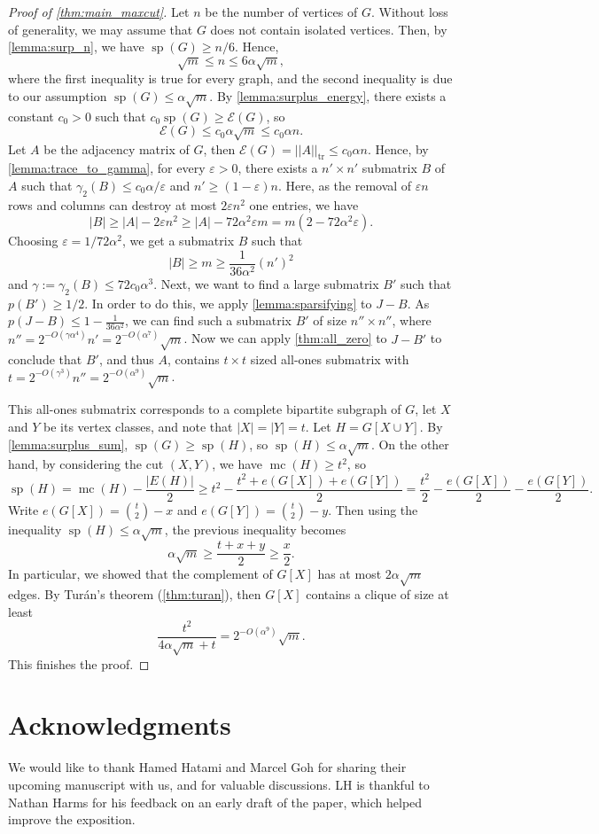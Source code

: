 \documentclass[11pt]{amsart}
\theoremstyle{plain}
\theoremstyle{definition}
\DeclareMathOperator{\tr}{tr}
\DeclareMathOperator{\surp}{sp}
\DeclareMathOperator{\mc}{mc}
\begin{document}
\begin{proof}[Proof of  \cref{thm:main_maxcut}]
Let $n$ be the number of vertices of $G$. Without loss of generality, we may assume that $G$ does not contain isolated vertices. Then, by  \cref{lemma:surp_n}, we have $\surp(G)\geq n/6$. Hence, $$\sqrt{m}\leq n\leq 6\alpha\sqrt{m},$$
where the first inequality is true for every graph, and the second inequality is due to our assumption $\surp(G)\leq \alpha\sqrt{m}$. By \cref{lemma:surplus_energy}, there exists a constant $c_0>0$ such that $c_0\surp(G)\geq \mathcal{E}(G)$, so $$\mathcal{E}(G)\leq c_0\alpha\sqrt{m}\leq c_0\alpha n.$$ Let $A$ be the adjacency matrix of $G$, then $\mathcal{E}(G)=||A||_{\tr}\leq c_0\alpha n$. Hence, by  \cref{lemma:trace_to_gamma}, for every $\varepsilon>0$, there exists a $n'\times n'$ submatrix $B$ of $A$ such that $\gamma_2(B)\leq c_0\alpha/\varepsilon$ and $n'\geq (1-\varepsilon)n$. Here, as the removal of $\varepsilon n$ rows and columns can destroy at most $2 \varepsilon n^2$ one entries, we have
$$|B|\geq |A|-2\varepsilon n^2\geq |A|-72\alpha^2\varepsilon m=m(2-72\alpha^2\varepsilon).$$
Choosing $\varepsilon=1/72\alpha^2$, we get a submatrix $B$ such that 
$$|B|\geq m\geq \frac{1}{36\alpha^2}(n')^2$$ and $\gamma:=\gamma_2(B)\leq 72c_0\alpha^3$. Next, we want to find a large submatrix $B'$ such that $p(B')\geq 1/2$. In order to do this, we apply  \cref{lemma:sparsifying}  to $J-B$. As $p(J-B)\leq 1-\frac{1}{36\alpha^2}$, we can find such a submatrix $B'$ of size $n''\times n''$, where $n''=2^{-O(\gamma\alpha^4)}n'=2^{-O(\alpha^7)}\sqrt{m}$.  Now we can apply \cref{thm:all_zero} to $J-B'$ to conclude that $B'$, and thus $A$, contains $t\times t$ sized all-ones submatrix with $t=2^{-O(\gamma^3)}n''=2^{-O(\alpha^9)}\sqrt{m}$.

This all-ones submatrix corresponds to a complete bipartite subgraph of $G$, let $X$ and $Y$ be its vertex classes, and note that $|X|=|Y|=t$. Let $H=G[X\cup Y]$. By \cref{lemma:surplus_sum}, $\surp(G)\geq \surp(H)$, so $\surp(H)\leq \alpha \sqrt{m}$. On the other hand, by considering the cut $(X,Y)$, we have $\mc(H)\geq t^2$, so
$$\surp(H)=\mc(H)-\frac{|E(H)|}{2}\geq t^2-\frac{t^2+e(G[X])+e(G[Y])}{2}=  \frac{t^2}{2}-\frac{e(G[X])}{2}-\frac{e(G[Y])}{2}.$$
Write $e(G[X])=\binom{t}{2}-x$ and $e(G[Y])=\binom{t}{2}-y$. Then using the inequality $\surp(H)\leq \alpha\sqrt{m}$, the previous inequality becomes
$$\alpha\sqrt{m}\geq \frac{t+x+y}{2}\geq \frac{x}{2}.$$
In particular, we showed that the complement of $G[X]$ has at most $2\alpha\sqrt{m}$ edges. By Tur\'an's theorem (\cref{thm:turan}), then $G[X]$ contains a clique of size at least
$$\frac{t^2}{4\alpha\sqrt{m}+t}=2^{-O(\alpha^9)}\sqrt{m}.$$
This finishes the proof.
\end{proof}

\section*{Acknowledgments} We would like to thank Hamed Hatami and Marcel Goh for sharing their upcoming manuscript with us, and for valuable discussions. LH is thankful to Nathan Harms for his feedback on an early draft of the paper, which helped improve the exposition.



\end{document}
